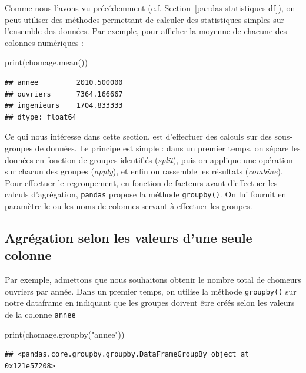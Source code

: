 \documentclass[12pt,]{book}
\newenvironment{Shaded}{\begin{snugshade}}{\end{snugshade}}
\newcommand{\StringTok}[1]{\textcolor[rgb]{0.31,0.60,0.02}{#1}}
\newcommand{\BuiltInTok}[1]{#1}
\newcommand{\NormalTok}[1]{#1}
\numberwithin{equation}{section}
\numberwithin{countremarque}{section}
\begin{document}
Comme nous l'avons vu précédemment (c.f.
Section~\ref{pandas-statistiques-df}), on peut utiliser des méthodes
permettant de calculer des statistiques simples sur l'ensemble des
données. Par exemple, pour afficher la moyenne de chacune des colonnes
numériques :

\begin{Shaded}
\begin{Highlighting}[]
\BuiltInTok{print}\NormalTok{(chomage.mean())}
\end{Highlighting}
\end{Shaded}

\begin{lstlisting}
## annee         2010.500000
## ouvriers      7364.166667
## ingenieurs    1704.833333
## dtype: float64
\end{lstlisting}

Ce qui nous intéresse dans cette section, est d'effectuer des calculs
sur des sous-groupes de données. Le principe est simple : dans un
premier temps, on sépare les données en fonction de groupes identifiés
(\emph{split}), puis on applique une opération sur chacun des groupes
(\emph{apply}), et enfin on rassemble les résultats (\emph{combine}).
Pour effectuer le regroupement, en fonction de facteurs avant
d'effectuer les calculs d'agrégation, \texttt{pandas} propose la méthode
\texttt{groupby()}. On lui fournit en paramètre le ou les noms de
colonnes servant à effectuer les groupes.

\subsection{Agrégation selon les valeurs d'une seule
colonne}\label{agregation-selon-les-valeurs-dune-seule-colonne}

Par exemple, admettons que nous souhaitons obtenir le nombre total de
chomeurs ouvriers par année. Dans un premier temps, on utilise la
méthode \texttt{groupby()} sur notre dataframe en indiquant que les
groupes doivent être créés selon les valeurs de la colonne
\texttt{annee}

\begin{Shaded}
\begin{Highlighting}[]
\BuiltInTok{print}\NormalTok{(chomage.groupby(}\StringTok{"annee"}\NormalTok{))}
\end{Highlighting}
\end{Shaded}

\begin{lstlisting}
## <pandas.core.groupby.groupby.DataFrameGroupBy object at 0x121e57208>
\end{lstlisting}
\end{document}

